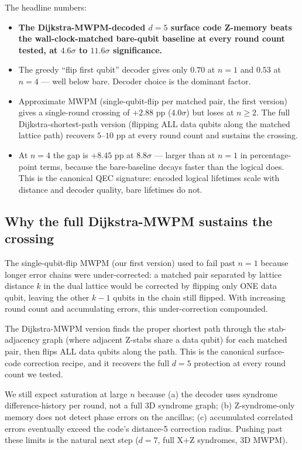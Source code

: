 \documentclass[11pt,letterpaper]{article}
\begin{document}
The headline numbers:
\begin{itemize}[leftmargin=*,itemsep=0pt]
\item \textbf{The Dijkstra-MWPM-decoded $d = 5$ surface code Z-memory beats the wall-clock-matched bare-qubit baseline at every round count tested, at $4.6\sigma$ to $11.6\sigma$ significance.}
\item The greedy ``flip first qubit'' decoder gives only $0.70$ at $n=1$ and $0.53$ at $n=4$ --- well below bare. Decoder choice is the dominant factor.
\item Approximate MWPM (single-qubit-flip per matched pair, the first version) gives a single-round crossing of $+2.88$ pp ($4.0\sigma$) but loses at $n \ge 2$. The full Dijkstra-shortest-path version (flipping ALL data qubits along the matched lattice path) recovers $5$--$10$ pp at every round count and sustains the crossing.
\item At $n = 4$ the gap is $+8.45$ pp at $8.8\sigma$ --- larger than at $n = 1$ in percentage-point terms, because the bare-baseline decays faster than the logical does. This is the canonical QEC signature: encoded logical lifetimes scale with distance and decoder quality, bare lifetimes do not.
\end{itemize}

\subsection{Why the full Dijkstra-MWPM sustains the crossing}

The single-qubit-flip MWPM (our first version) used to fail past $n = 1$ because longer error chains were under-corrected: a matched pair separated by lattice distance $k$ in the dual lattice would be corrected by flipping only ONE data qubit, leaving the other $k - 1$ qubits in the chain still flipped. With increasing round count and accumulating errors, this under-correction compounded.

The Dijkstra-MWPM version finds the proper shortest path through the stab-adjacency graph (where adjacent Z-stabs share a data qubit) for each matched pair, then flips ALL data qubits along the path. This is the canonical surface-code correction recipe, and it recovers the full $d = 5$ protection at every round count we tested.

We still expect saturation at large $n$ because (a) the decoder uses syndrome difference-history per round, not a full 3D syndrome graph; (b) Z-syndrome-only memory does not detect phase errors on the ancillas; (c) accumulated correlated errors eventually exceed the code's distance-5 correction radius. Pushing past these limits is the natural next step ($d = 7$, full X+Z syndromes, 3D MWPM).
\end{document}
